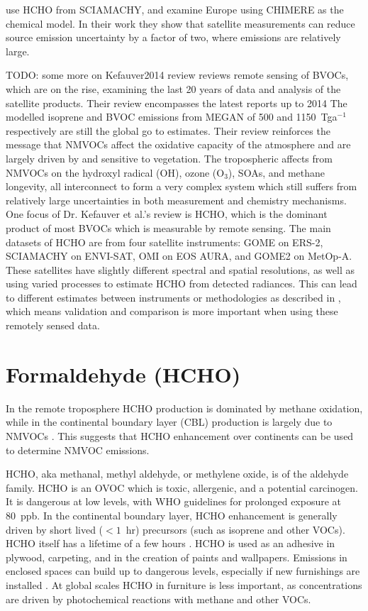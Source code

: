    \citet{Dufour2009} use HCHO from SCIAMACHY, and examine Europe using CHIMERE as the chemical model. 
   In their work they show that satellite measurements can reduce source emission uncertainty by a factor of two, where emissions are relatively large.
   
   TODO: some more on Kefauver2014 review 
   \cite{Kefauver2014} reviews remote sensing of BVOCs, which are on the rise, examining the last 20 years of data and analysis of the satellite products.
   Their review encompasses the latest reports up to 2014
   The modelled isoprene and BVOC emissions from MEGAN \citep{Guenther2000} of 500 and 1150~Tga$^{-1}$ respectively are still the global go to estimates.
   Their review reinforces the message that NMVOCs affect the oxidative capacity of the atmosphere and are largely driven by and sensitive to vegetation.
   The tropospheric affects from NMVOCs on the hydroxyl radical (OH), ozone (O$_3$), SOAs, and methane longevity, all interconnect to form a very complex system which still suffers from relatively large uncertainties in both measurement and chemistry mechanisms.
   One focus of Dr. Kefauver et al.'s review is HCHO, which is the dominant product of most BVOCs which is measurable by remote sensing.
   The main datasets of HCHO are from four satellite instruments: GOME on ERS-2, SCIAMACHY on ENVI-SAT, OMI on EOS AURA, and GOME2 on MetOp-A.
   These satellites have slightly different spectral and spatial resolutions, as well as using varied processes to estimate HCHO from detected radiances.
   This can lead to different estimates between instruments or methodologies as described in \cite{Lorent2017}, which means validation and comparison is more important when using these remotely sensed data.
  
\section{Formaldehyde (HCHO)}
  \label{LR:HCHO}
  
  In the remote troposphere HCHO production is dominated by methane oxidation, while in the continental boundary layer (CBL) production is largely due to NMVOCs \citep{Abbot2003, Kefauver2014}.
  This suggests that HCHO enhancement over continents can be used to determine NMVOC emissions.
  
  HCHO, aka methanal, methyl aldehyde, or methylene oxide, is of the aldehyde family.
  HCHO is an OVOC which is toxic, allergenic, and a potential carcinogen. 
  It is dangerous at low levels, with WHO guidelines for prolonged exposure at 80~ppb.
  In the continental boundary layer, HCHO enhancement is generally driven by short lived ($<1$~hr) precursors (such as isoprene and other VOCs).
  HCHO itself has a lifetime of a few hours \citep{Kefauver2014}.
  HCHO is used as an adhesive in plywood, carpeting, and in the creation of paints and wallpapers.
  Emissions in enclosed spaces can build up to dangerous levels, especially if new furnishings are installed \citep{Davenport2015}.
  At global scales HCHO in furniture is less important, as concentrations are driven by photochemical reactions with methane and other VOCs.
  
